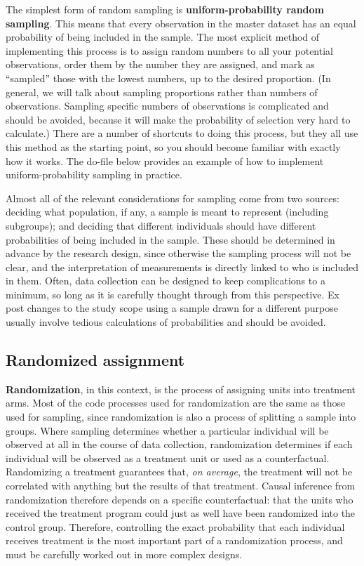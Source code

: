 The simplest form of random sampling is \textbf{uniform-probability random sampling}.
This means that every observation in the master dataset
has an equal probability of being included in the sample.
The most explicit method of implementing this process
is to assign random numbers to all your potential observations,
order them by the number they are assigned,
and mark as ``sampled'' those with the lowest numbers, up to the desired proportion.
(In general, we will talk about sampling proportions rather than numbers of observations.
Sampling specific numbers of observations is complicated and should be avoided,
because it will make the probability of selection very hard to calculate.)
There are a number of shortcuts to doing this process,
but they all use this method as the starting point,
so you should become familiar with exactly how it works.
The do-file below provides an example of how to implement uniform-probability sampling in practice. 


Almost all of the relevant considerations for sampling come from two sources:
deciding what population, if any, a sample is meant to represent (including subgroups);
and deciding that different individuals should have different probabilities
of being included in the sample.
These should be determined in advance by the research design,
since otherwise the sampling process will not be clear,
and the interpretation of measurements is directly linked to who is included in them.
Often, data collection can be designed to keep complications to a minimum,
so long as it is carefully thought through from this perspective.
Ex post changes to the study scope using a sample drawn for a different purpose
usually involve tedious calculations of probabilities and should be avoided.


\subsection{Randomized assignment}

\textbf{Randomization}, in this context, is the process of assigning units into treatment arms.
Most of the code processes used for randomization are the same as those used for sampling,
since randomization is also a process of splitting a sample into groups.
Where sampling determines whether a particular individual
will be observed at all in the course of data collection,
randomization determines if each individual will be observed
as a treatment unit or used as a counterfactual.
Randomizing a treatment guarantees that, \textit{on average},
the treatment will not be correlated with anything but the results of that treatment.\cite{duflo2007using}
Causal inference from randomization therefore depends on a specific counterfactual:
that the units who received the treatment program
could just as well have been randomized into the control group.
Therefore, controlling the exact probability that each individual receives treatment
is the most important part of a randomization process,
and must be carefully worked out in more complex designs.

